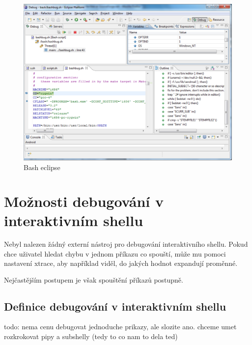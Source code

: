 \documentclass[thesis=M,czech]{FITthesis}[2012/06/26]
\begin{document}
\begin{figure}
	\includegraphics[width=1.0\textwidth]{./images/bash_eclipse}
	\caption{Bash eclipse}
	\label{fig:bash_eclipse}
\end{figure}





%
%
%
%
%
\section{Možnosti debugování v interaktivním shellu}

Nebyl nalezen žádný externí nástroj pro debugování interaktivního shellu. Pokud chce uživatel hledat chybu v jednom příkazu co spouští, může mu pomoci nastavení xtrace, aby například viděl, do jakých hodnot expandují proměnné.

Nejčastějším postupem je však spouštění příkazů postupně.

%
%
\subsection{Definice debugování v interaktivním shellu}
todo: nema cenu debugovat jednoduche prikazy, ale slozite ano. chceme umet rozkrokovat pipy a subshelly (tedy to co nam to dela ted)
\end{document}
